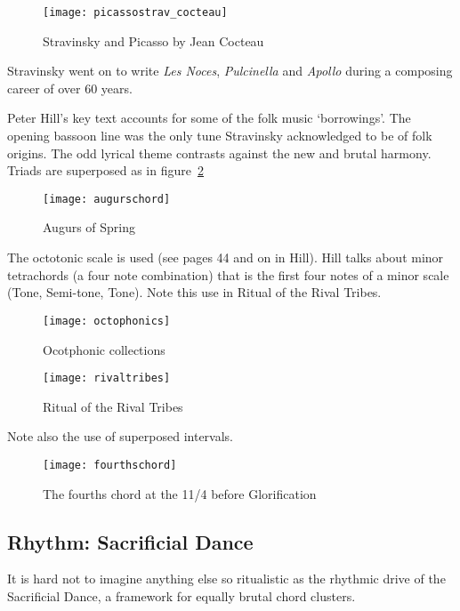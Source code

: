 \begin{figure}[H]
\centering
\texttt{[image: picassostrav\_cocteau]}\caption{Stravinsky and Picasso by Jean Cocteau}
\label{fig:stravpicasso_cocteau}
\end{figure}

Stravinsky went on to write \textit{Les Noces}, \textit{Pulcinella} and \textit{Apollo} during a composing career of over 60 years.  

Peter Hill's key text \citeyearpar{hill2000stravinsky} accounts for some of the folk music `borrowings'. The opening bassoon line was the only tune Stravinsky acknowledged to be of folk origins. The odd lyrical theme contrasts against the new and brutal harmony. Triads are superposed as in figure~\ref{fig:augurschord} 

\begin{figure}[H]
\centering
\texttt{[image: augurschord]}\caption{Augurs of Spring}
\label{fig:augurschord}
\end{figure}

The octotonic scale is used (see pages 44 and on in Hill). Hill talks about minor tetrachords (a four note combination) that is the first four notes of a minor scale (Tone, Semi-tone, Tone). Note this use in Ritual of the Rival Tribes.

\begin{figure}[H]
\centering
\texttt{[image: octophonics]}\caption{Ocotphonic collections}
\label{fig:octophonics}
\end{figure}

\begin{figure}[H]
\centering
\texttt{[image: rivaltribes]}\caption{Ritual of the Rival Tribes}
\label{fig:rivaltribes}
\end{figure}

Note also the use of superposed intervals. 

\begin{figure}[H]
\centering
\texttt{[image: fourthschord]}\caption{The fourths chord at the 11/4 before Glorification}
\label{fig:fourthschord}
\end{figure}

\subsection{Rhythm: Sacrificial Dance}

It is hard not to imagine anything else so ritualistic as the rhythmic drive of the Sacrificial Dance, a framework for equally brutal chord clusters. 

